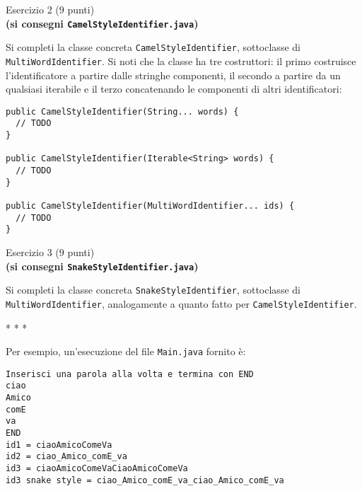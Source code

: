 \documentclass[12pt]{article}
\begin{document}
\vspace*{1ex}
\begin{center}{\Large Esercizio 2} ($9$ punti)\\
  \textbf{(si consegni \texttt{CamelStyleIdentifier.java})}
\end{center}

Si completi la classe concreta \texttt{CamelStyleIdentifier}, sottoclasse
di \texttt{MultiWordIdentifier}. Si noti che la classe ha tre costruttori:
il primo costruisce l'identificatore a partire dalle stringhe componenti,
il secondo a partire da un qualsiasi iterabile e il terzo concatenando le
componenti di altri identificatori:

{\small\begin{verbatim}
public CamelStyleIdentifier(String... words) {
  // TODO
}

public CamelStyleIdentifier(Iterable<String> words) {
  // TODO
}

public CamelStyleIdentifier(MultiWordIdentifier... ids) {
  // TODO
}
\end{verbatim}}

\vspace*{1ex}
\begin{center}{\Large Esercizio 3} ($9$ punti)\\
  \textbf{(si consegni \texttt{SnakeStyleIdentifier.java})}
\end{center}

Si completi la classe concreta \texttt{SnakeStyleIdentifier}, sottoclasse
di \texttt{MultiWordIdentifier}, analogamente a quanto fatto per
\texttt{CamelStyleIdentifier}.

\begin{center}
  * * *
\end{center}

Per esempio, un'esecuzione del file \texttt{Main.java} fornito \`e:

\begin{mdframed}[backgroundcolor=lightgrey] 
\begin{verbatim}
Inserisci una parola alla volta e termina con END
ciao
Amico
comE
va
END
id1 = ciaoAmicoComeVa
id2 = ciao_Amico_comE_va
id3 = ciaoAmicoComeVaCiaoAmicoComeVa
id3 snake style = ciao_Amico_comE_va_ciao_Amico_comE_va
\end{verbatim}
\end{mdframed}
\end{document}
